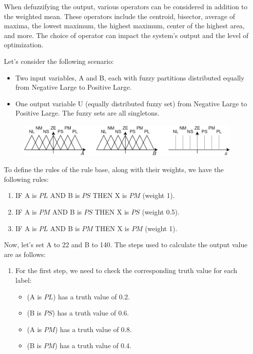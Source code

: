 When defuzzifying the output, various operators can be considered in addition to the weighted mean. 
These operators include the centroid, bisector, average of maxima, the lowest maximum, the highest maximum, center of the highest area, and more. 
The choice of operator can impact the system's output and the level of optimization.
\begin{example}
    Let's consider the following scenario:
    \begin{itemize}
        \item Two input variables, A and B, each with fuzzy partitions distributed equally from Negative Large to Positive Large.
        \item One output variable U (equally distributed fuzzy set) from Negative Large to Positive Large. The fuzzy sets are all singletons.
    \end{itemize} 
    \begin{figure}[H]
        \centering
        \includegraphics[width=0.75\linewidth]{images/rules.png}
    \end{figure}
    To define the rules of the rule base, along with their weights, we have the following rules:
    \begin{enumerate}
        \item IF A is $PL$ AND B is $PS$ THEN X is $PM$ (weight 1).
        \item IF A is $PM$ AND B is $PS$ THEN X is $PS$ (weight 0.5).
        \item IF A is $PL$ AND B is $PM$ THEN X is $PM$ (weight 1).
    \end{enumerate}
    Now, let's set A to 22 and B to 140. 
    The steps used to calculate the output value are as follows:
    \begin{enumerate}
        \item For the first step, we need to check the corresponding truth value for each label:
            \begin{itemize}
                \item (A is $PL$) has a truth value of 0.2.
                \item (B is $PS$) has a truth value of 0.6.
                \item (A is $PM$) has a truth value of 0.8.
                \item (B is $PM$) has a truth value of 0.4.

\end{itemize}
\end{enumerate}
\end{example}
